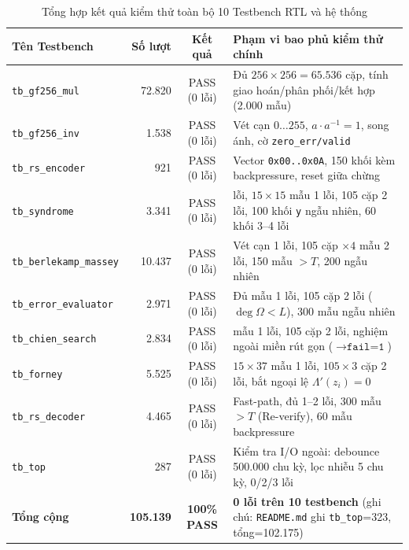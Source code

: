 \documentclass[11pt,a4paper]{report}
\begin{document}
\begin{table}[!htb]
    \centering
    \caption{Tổng hợp kết quả kiểm thử toàn bộ 10 Testbench RTL và hệ thống}
    \label{tab:tb-summary}
    \scriptsize
    \setlength{\tabcolsep}{3.5pt}
    \renewcommand{\arraystretch}{1.03}
    \begin{tabularx}{\textwidth}{l r c >{\raggedright\arraybackslash}X}
        \toprule
        \textbf{Tên Testbench} & \textbf{Số lượt} & \textbf{Kết quả} & \textbf{Phạm vi bao phủ kiểm thử chính} \\
        \midrule
        \texttt{tb\_gf256\_mul} & 72.820 & PASS (0 lỗi) & Đủ $256\times 256=65.536$ cặp, tính giao hoán/phân phối/kết hợp (2.000 mẫu) \\
        \texttt{tb\_gf256\_inv} & 1.538 & PASS (0 lỗi) & Vét cạn $0\dots 255$, $a\cdot a^{-1}=1$, song ánh, cờ \texttt{zero\_err/valid} \\
        \texttt{tb\_rs\_encoder} & 921 & PASS (0 lỗi) & Vector \texttt{0x00..0x0A}, 150 khối kèm backpressure, reset giữa chừng \\
        \texttt{tb\_syndrome} & 3.341 & PASS (0 lỗi) & 0 lỗi, $15\times 15$ mẫu 1 lỗi, 105 cặp 2 lỗi, 100 khối \texttt{y} ngẫu nhiên, 60 khối 3--4 lỗi \\
        \texttt{tb\_berlekamp\_massey} & 10.437 & PASS (0 lỗi) & Vét cạn 1 lỗi, 105 cặp $\times 4$ mẫu 2 lỗi, 150 mẫu $>T$, 200 ngẫu nhiên \\
        \texttt{tb\_error\_evaluator} & 2.971 & PASS (0 lỗi) & Đủ mẫu 1 lỗi, 105 cặp 2 lỗi ($\deg\Omega<L$), 300 mẫu ngẫu nhiên \\
        \texttt{tb\_chien\_search} & 2.834 & PASS (0 lỗi) & 15 mẫu 1 lỗi, 105 cặp 2 lỗi, nghiệm ngoài miền rút gọn ($\to\texttt{fail=1}$) \\
        \texttt{tb\_forney} & 5.525 & PASS (0 lỗi) & $15\times 37$ mẫu 1 lỗi, $105\times 3$ cặp 2 lỗi, bắt ngoại lệ $\Lambda'(z_i)=0$ \\
        \texttt{tb\_rs\_decoder} & 4.465 & PASS (0 lỗi) & Fast-path, đủ 1--2 lỗi, 300 mẫu $>T$ (Re-verify), 60 mẫu backpressure \\
        \texttt{tb\_top} & 287 & PASS (0 lỗi) & Kiểm tra I/O ngoài: debounce 500.000 chu kỳ, lọc nhiễu 5 chu kỳ, 0/2/3 lỗi \\
        \midrule
        \textbf{Tổng cộng} & \textbf{105.139} & \textbf{100\% PASS} & \textbf{0 lỗi trên 10 testbench} (ghi chú: \texttt{README.md} ghi \texttt{tb\_top}=323, tổng=102.175) \\
        \bottomrule
    \end{tabularx}
\end{table}
\end{document}
